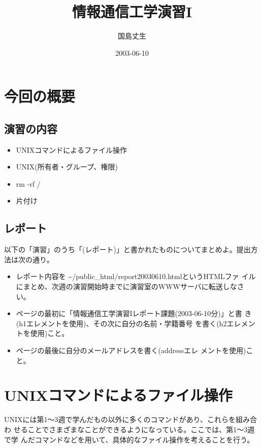 \documentclass[a4j,10pt]{jarticle}
\begin{document}
\title{情報通信工学演習I}
\author{国島丈生}
\date{2003-06-10}
\maketitle
\section{今回の概要}
\subsection{演習の内容}
\begin{itemize}
 \item UNIXコマンドによるファイル操作
 \item UNIX(所有者・グループ、権限)
 \item rm -rf /
 \item 片付け
\end{itemize}

\subsection{レポート}
以下の「演習」のうち「(レポート)」と書かれたものについてまとめよ。提出方
法は次の通り。
\begin{itemize}
 \item レポート内容を{\sffamily
       \~{}{\slash}public\_html{\slash}report20030610.html}というHTMLファ
       イルにまとめ、次週の演習開始時までに演習室のWWWサーバに転送しなさ
       い。
 \item ページの最初に「情報通信工学演習Iレポート課題(2003-06-10分)」と書
       き({\sffamily h1}エレメントを使用)、その次に自分の名前・学籍番号
       を書く({\sffamily h2エレメントを使用})こと。
 \item ページの最後に自分のメールアドレスを書く({\sffamily address}エレ
       メントを使用)こと。
\end{itemize}

\section{UNIXコマンドによるファイル操作}
UNIXには第1〜3週で学んだもの以外に多くのコマンドがあり、これらを組み合わ
せることでさまざまなことができるようになっている。ここでは、第1〜3週で学
んだコマンドなどを用いて、具体的なファイル操作を考えることを行う。
\end{document}
